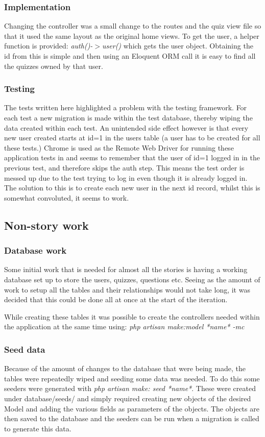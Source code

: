 \subsubsection{Implementation}
Changing the controller was a small change to the routes and the quiz view file so that it used the same layout as the original home views. To get the user, a helper function is provided: \textit{auth()-$>$user()} which gets the user object. Obtaining the id from this is simple and then using an Eloquent ORM call it is easy to find all the quizzes owned by that user.
\subsubsection{Testing}
The tests written here highlighted a problem with the testing framework. For each test a new migration is made within the test database, thereby wiping the data created within each test. An unintended side effect however is that every new user created starts at id=1 in the users table (a user has to be created for all these tests.) Chrome is used as the Remote Web Driver for running these application tests in and seems to remember that the user of id=1 logged in in the previous test, and therefore skips the auth step. This means the test order is messed up due to the test trying to log in even though it is already logged in. The solution to this is to create each new user in the next id record, whilst this is somewhat convoluted, it seems to work.
\newpage

\subsection{Non-story work}
\subsubsection{Database work}
Some initial work that is needed for almost all the stories is having a working database set up to store the users, quizzes, questions etc. Seeing as the amount of work to setup all the tables and their relationships would not take long, it was decided that this could be done all at once at the start of the iteration.

While creating these tables it was possible to create the controllers needed within the application at the same time using: \textit{php artisan make:model *name* -mc } 
\subsubsection{Seed data}
Because of the amount of changes to the database that were being made, the tables were repeatedly wiped and seeding some data was needed. To do this some seeders were generated with \textit{php artisan make: seed *name*}. These were created under database/seeds/ and simply required creating new objects of the desired Model and adding the various fields as parameters of the objects. The objects are then saved to the database and the seeders can be run when a migration is called to generate this data.
